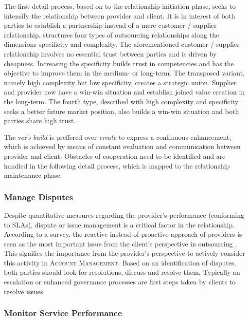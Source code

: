 	The first detail process, based on to the relationship initiation phase, seeks to intensify the relationship between provider and client. It is in interest of both parties to establish a partnership instead of a mere customer / supplier relationship. \cite{Franceschini_2003} structures four types of outsourcing relationships along the dimensions specificity and complexity. The aforementioned customer / supplier relationship involves no essential trust between parties and is driven by cheapness. Increasing the specificity builds trust in competencies and has the objective to improve them in the medium- or long-term. The transposed variant, namely high complexity but low specificity, creates a strategic union. Supplier and provider now have a win-win situation and establish joined value creation in the long-term. The fourth type, described with high complexity and specificity seeks a better future market position, also builds a win-win situation and both parties share high trust. 
	
	The verb \textit{build} is preffered over \textit{create} to express a continuous enhancement, which is achieved by means of constant evaluation and communication between provider and client. Obstacles of cooperation need to be identified and are handled in the following detail process, which is mapped to the relationship maintenance phase. 
	
	\subsubsection{Manage Disputes}
	
	Despite quantitative measures regarding the provider's performance (\eg conforming to \acrshort{SLA}s), dispute or issue management is a critical factor in the relationship. According to a survey, the reactive instead of proactive approach of providers is seen as the most important issue from the client's perspective in outsourcing  \citep{deloitte2014outsourcing}. This signifies the importance from the provider's perspective to actively consider this activity in \textsc{Account Management}. Based on an identification of disputes, both parties should look for resolutions, discuss and resolve them. Typically an escalation or enhanced governance processes are first steps taken by clients to resolve issues.
	
	\subsubsection{Monitor Service Performance}
	
